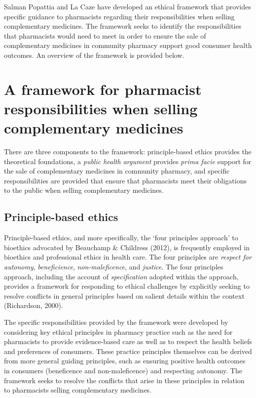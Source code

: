 \documentclass[12pt,]{article}
\begin{document}
Salman Popattia and La Caze have developed an ethical framework that
provides specific guidance to pharmacists regarding their
responsibilities when selling complementary medicines. The framework
seeks to identify the responsibilities that pharmacists would need to
meet in order to ensure the sale of complementary medicines in community
pharmacy support good consumer health outcomes. An overview of the
framework is provided below.

\section{A framework for pharmacist responsibilities when selling
complementary
medicines}\label{a-framework-for-pharmacist-responsibilities-when-selling-complementary-medicines}

There are three components to the framework: principle-based ethics
provides the theoretical foundations, a \emph{public health argument}
provides \emph{prima facie} support for the sale of complementary
medicines in community pharmacy, and specific responsibilities are
provided that ensure that pharmacists meet their obligations to the
public when selling complementary medicines.

\subsection{Principle-based ethics}\label{principle-based-ethics}

Principle-based ethics, and more specifically, the `four principles
approach' to bioethics advocated by Beauchamp \& Childress (2012), is
frequently employed in bioethics and professional ethics in health care.
The four principles are \emph{respect for autonomy},
\emph{beneficience}, \emph{non-maleficence}, and \emph{justice}. The
four principles approach, including the account of \emph{specification}
adopted within the approach, provides a framework for responding to
ethical challenges by explicitly seeking to resolve conflicts in general
principles based on salient details within the context (Richardson,
2000).

The specific responsibilities provided by the framework were developed
by considering key ethical principles in pharmacy practice such as the
need for pharmacists to provide evidence-based care as well as to
respect the health beliefs and preferences of consumers. These practice
principles themselves can be derived from more general guiding
principles, such as ensuring positive health outcomes in consumers
(beneficence and non-maleficence) and respecting autonomy. The framework
seeks to resolve the conflicts that arise in these principles in
relation to pharmacists selling complementary medicines.
\end{document}
